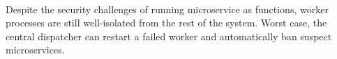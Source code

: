 %


~\\
Despite the security challenges of running microservice as functions, worker
processes are still well-isolated from the rest of the system.
Worst case, the central dispatcher can restart a failed worker and
automatically ban suspect microservices.
